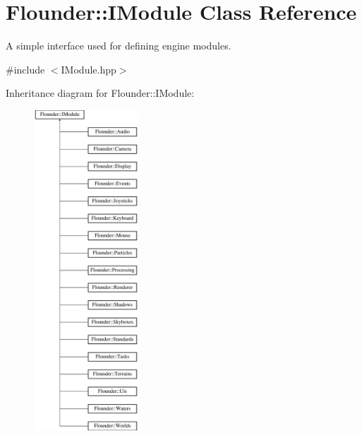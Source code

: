 \hypertarget{class_flounder_1_1_i_module}{}\section{Flounder\+:\+:I\+Module Class Reference}
\label{class_flounder_1_1_i_module}


A simple interface used for defining engine modules.  




{\ttfamily \#include $<$I\+Module.\+hpp$>$}

Inheritance diagram for Flounder\+:\+:I\+Module\+:\begin{figure}[H]
\begin{center}
\leavevmode
\includegraphics[height=12.000000cm]{class_flounder_1_1_i_module}
\end{center}
\end{figure}
